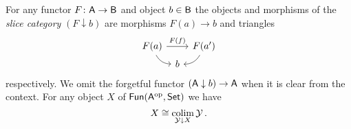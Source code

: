 For any functor $F \colon \mathsf{A} \to \mathsf{B}$ and object $b \in \mathsf{B}$ the objects and morphisms of the \textit{slice category} $(F \downarrow b)$ are morphisms $F(a) \to b$ and triangles
\[
\begin{tikzcd}[column sep=5, row sep=2]
	F(a) \arrow[rr, "F(f)"] \arrow[dr, bend right] & & F(a^\prime) \arrow[dl, bend left] \\
	& b &
\end{tikzcd}
\]
respectively.
We omit the forgetful functor $(\mathsf{A} \downarrow b) \to \mathsf{A}$ when it is clear from the context.
For any object $X$ of $\mathsf{Fun}(\mathsf{A}^{\mathrm{op}}, \mathsf{Set})$ we have
\[
X \cong \operatorname*{colim}_{\operatorname{\mathcal{Y}} \downarrow X} \operatorname{\mathcal{Y}}.
\]